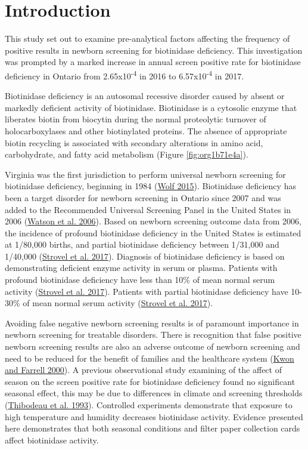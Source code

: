 \documentclass[review]{elsarticle}
\begin{document}
\section*{Introduction}
\label{sec:orgcce9725}
This study set out to examine pre-analytical factors affecting the
frequency of positive results in newborn screening for biotinidase
deficiency. This investigation was prompted by a marked increase in
annual screen positive rate for biotinidase deficiency in Ontario from
2.65x10\textsuperscript{-4} in 2016 to 6.57x10\textsuperscript{-4} in 2017.

Biotinidase deficiency is an autosomal recessive disorder caused by
absent or markedly deficient activity of biotinidase.  Biotinidase is
a cytosolic enzyme that liberates biotin from biocytin during the
normal proteolytic turnover of holocarboxylases and other biotinylated
proteins. The absence of appropriate biotin recycling is associated
with secondary alterations in amino acid, carbohydrate, and fatty acid
metabolism (Figure \ref{fig:org1b71e4a}).

Virginia was the first jurisdiction to perform universal newborn
screening for biotinidase deficiency, beginning in 1984 (\hyperlink{citeproc_bib_item_10}{Wolf 2015}). Biotinidase deficiency has been a target disorder
for newborn screening in Ontario since 2007 and was added to the
Recommended Universal Screening Panel in the United States in 2006 (\hyperlink{citeproc_bib_item_8}{Watson et al. 2006}).  Based on newborn screening outcome data from
2006, the incidence of profound biotinidase deficiency in the United
States is estimated at 1/80,000 births, and partial biotinidase
deficiency between 1/31,000 and 1/40,000 (\hyperlink{citeproc_bib_item_5}{Strovel et al. 2017}). Diagnosis of biotinidase deficiency is based on
demonstrating deficient enzyme activity in serum or plasma. Patients
with profound biotinidase deficiency have less than 10\% of mean normal
serum activity (\hyperlink{citeproc_bib_item_5}{Strovel et al. 2017}). Patients with partial biotinidase
deficiency have 10-30\% of mean normal serum activity (\hyperlink{citeproc_bib_item_5}{Strovel et al. 2017}).

Avoiding false negative newborn screening results is of paramount
importance in newborn screening for treatable disorders. There is
recognition that false positive newborn screening results are also an
adverse outcome of newborn screening and need to be reduced for the
benefit of families and the healthcare system (\hyperlink{citeproc_bib_item_3}{Kwon and Farrell 2000}). A
previous observational study examining of the affect of season on the
screen positive rate for biotinidase deficiency found no significant
seasonal effect, this may be due to differences in climate and
screening thresholds (\hyperlink{citeproc_bib_item_7}{Thibodeau et al. 1993}). Controlled experiments
demonstrate that exposure to high temperature and humidity decreases
biotinidase activity. Evidence presented here demonstrates that both
seasonal conditions and filter paper collection cards affect
biotinidase activity.
\end{document}
